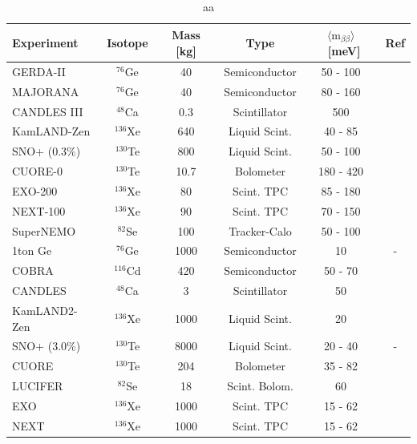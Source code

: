 \documentclass[main.tex]{subfiles}
\begin{document}
\begin{table}
\centering
\begin{tabular}{lccccc}
\toprule
Experiment & Isotope & Mass [kg] & Type & $ \langle \text{m}_{\beta\beta} \rangle$~[meV] & Ref \\ 
\midrule
GERDA-II     & $^{\text{76}}$Ge  & 40   & Semiconductor & 50 - 100  & \cite{GERDA}        \\
MAJORANA     & $^{\text{76}}$Ge  & 40   & Semiconductor & 80 - 160  & \cite{MAJORANA}     \\
CANDLES III  & $^{\text{48}}$Ca  & 0.3  & Scintillator  & 500       & \cite{CANDLESIII}   \\
KamLAND-Zen  & $^{\text{136}}$Xe & 640  & Liquid Scint. & 40 - 85   & \cite{KamLAND-Zen3} \\
SNO+ (0.3\%) & $^{\text{130}}$Te & 800  & Liquid Scint. & 50 - 100  &  \\
CUORE-0      & $^{\text{130}}$Te & 10.7 & Bolometer     & 180 - 420 & \cite{CUORE}        \\
EXO-200      & $^{\text{136}}$Xe & 80   & Scint. TPC    & 85 - 180  & \cite{EXO-200}      \\
NEXT-100     & $^{\text{136}}$Xe & 90   & Scint. TPC    & 70 - 150  & \cite{NEXT}         \\
SuperNEMO    & $^{\text{82}}$Se  & 100  & Tracker-Calo  & 50 - 100  &  \\
\midrule
1ton Ge      & $^{\text{76}}$Ge  & 1000 & Semiconductor & 10        & - \\
COBRA        & $^{\text{116}}$Cd & 420  & Semiconductor & 50 - 70   & \cite{COBRA}        \\
CANDLES      & $^{\text{48}}$Ca  & 3    & Scintillator  & 50        & \cite{CANDLESIII}   \\
KamLAND2-Zen & $^{\text{136}}$Xe & 1000 & Liquid Scint. & 20        & \cite{KamLAND-Zen3} \\
SNO+ (3.0\%) & $^{\text{130}}$Te & 8000 & Liquid Scint. & 20 - 40   & - \\
CUORE        & $^{\text{130}}$Te & 204  & Bolometer     & 35 - 82   & \cite{CUORE}        \\
LUCIFER      & $^{\text{82}}$Se  & 18   & Scint. Bolom. & 60        & \cite{LUCIFER}      \\
EXO          & $^{\text{136}}$Xe & 1000 & Scint. TPC    & 15 - 62   & \cite{EXO-200}      \\
NEXT         & $^{\text{136}}$Xe & 1000 & Scint. TPC    & 15 - 62   & \cite{NEXT}         \\
\bottomrule
\end{tabular}
\caption{aa}
\label{tab:futureBBexperiment}
\end{table}
\end{document}
